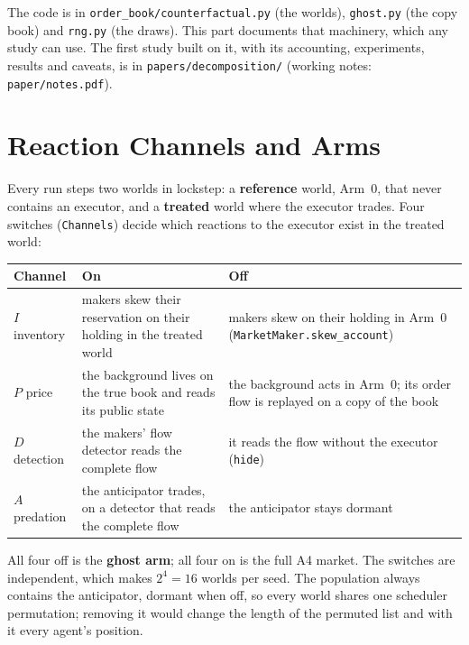 \documentclass[11pt,a4paper]{article}
\newcommand{\code}[1]{\texttt{#1}}
\begin{document}
The code is in \code{order\_book/counterfactual.py} (the worlds), \code{ghost.py} (the copy book) and \code{rng.py} (the draws). This part
documents that machinery, which any study can use. The first study built on it, with its accounting, experiments, results and caveats, is in \code{papers/decomposition/}
(working notes: \code{paper/notes.pdf}).

\section{Reaction Channels and Arms}
\label{sec:channels}

Every run steps two worlds in lockstep: a \textbf{reference} world, Arm~0, that never contains an executor, and a
\textbf{treated} world where the executor trades. Four switches (\code{Channels}) decide which reactions to the
executor exist in the treated world:

\begin{center}\small
\begin{tabular}{@{}lL{5.6cm}L{5.6cm}@{}}
\toprule
Channel & On & Off \\
\midrule
$I$ inventory & makers skew their reservation on their holding in the treated world & makers skew on their holding in Arm~0 (\code{MarketMaker.skew\_account}) \\
$P$ price & the background lives on the true book and reads its public state & the background acts in Arm~0; its order flow is replayed on a copy of the book \\
$D$ detection & the makers' flow detector reads the complete flow & it reads the flow without the executor (\code{hide}) \\
$A$ predation & the anticipator trades, on a detector that reads the complete flow & the anticipator stays dormant \\
\bottomrule
\end{tabular}
\end{center}

All four off is the \textbf{ghost arm}; all four on is the full A4 market. The switches are independent, which makes
$2^4 = 16$ worlds per seed. The population always contains the anticipator, dormant when off, so every world shares one
scheduler permutation; removing it would change the length of the permuted list and with it every agent's position.
\end{document}

